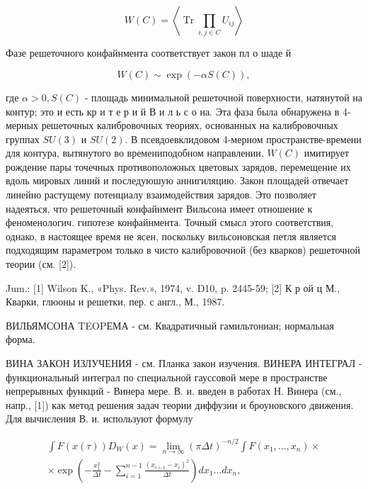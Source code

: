 \documentclass[10pt]{article}
\begin{document}
\[

W(C)=\left\langle\operatorname{Tr} \prod_{i, j \in C} U_{i j}\right\rangle

\]



Фазе решеточного конфайнмента соответствует закон пл о шаде й



\[

W(C) \sim \exp (-\alpha S(C)),

\]



где $\alpha>0, S(C)$ - площадь минимальной решеточной поверхности, натянутой на контур; это и есть кр и т е р и й В и л ь с о на. Эта фаза была обнаружена в 4-мерных решеточных калибровочных теориях, основанных на калибровочных группах $S U(3)$ и $S U(2)$. В псевдоевклидовом 4-мерном пространстве-времени для контура, вытянутого во времениподобном направлении, $W(C)$ имитирует рождение пары точечных противоположных цветовых зарядов, перемещение их вдоль мировых линий и последуюшую аннигиляцию. Закон площадей отвечает линейно растущему потенциалу взаимодействия зарядов. Это позволяет надеяться, что решеточный конфайнмент Вильсона имеет отношение к феноменологич. гипотезе конфайнмента. Точный смысл этого соответствия, однако, в настоящее время не ясен, поскольку вильсоновская петля является подходящим параметром только в чисто калибровочной (без кварков) решеточной теории (см. [2]).



Jum.: [1] Wilson K., «Phys. Rev.», 1974, v. D10, p. 2445-59; [2] К р ой ц М., Кварки, глюоны и решетки, пер. с англ., М., 1987.



ВИЛЬЯМСОНА TEOPЕМА - см. Квадратичный гамильтониан; нормальная форма.



ВИНА ЗАКОН ИЗЛУЧЕНИЯ - см. Планка закон изучения. ВИНЕРА ИНТЕГРАЛ - функциональный интеграл по специальной гауссовой мере в пространстве непрерывных функций - Винера мере. В. и. введен в работах Н. Винера (см., напр., [1]) как метод решения задач теории диффузии и броуновского движения. Для вычисления В. и. используют формулу



\[

\begin{gathered}

\int F(x(\tau)) D_{W}(x)=\lim _{n \rightarrow \infty}(\pi \Delta t)^{-n / 2} \int F\left(x_{1}, \ldots, x_{n}\right) \times \\

\times \exp \left(-\frac{x_{1}^{2}}{\Delta t}-\sum_{i=1}^{n-1} \frac{\left(x_{i+1}-x_{i}\right)^{2}}{\Delta t}\right) d x_{1} \ldots d x_{n},

\end{gathered}

\]
\end{document}

